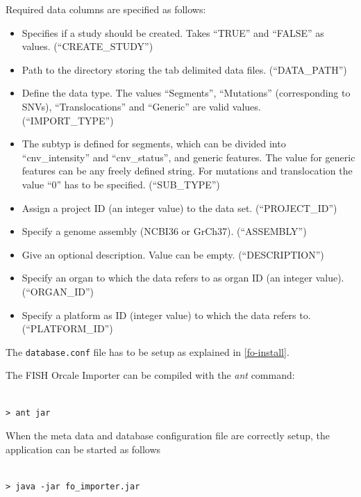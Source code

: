 \documentclass[11pt,final]{article}
\begin{document}
Required data columns are specified as follows:

\begin{itemize}
  \item Specifies if a study should be created. Takes ``TRUE'' and ``FALSE'' as
    values. (``{CREATE\_STUDY}'')
  \item Path to the directory storing the tab delimited data files.
        (``DATA\_PATH'')
  \item Define the data type. The values ``Segments'', ``Mutations''
        (corresponding to SNVs), ``Translocations'' and ``Generic'' are valid 
	values. (``IMPORT\_TYPE'')
  \item The subtyp is defined for segments, which can be divided into
        ``cnv\_intensity'' and ``cnv\_status'', and generic features. The value
	for generic features can be any freely defined string. For mutations and
	translocation the value ``0'' has to be specified. (``SUB\_TYPE'')
  \item Assign a project ID (an integer value) to the data set.
        (``PROJECT\_ID'')
  \item Specify a genome assembly (NCBI36 or GrCh37). (``ASSEMBLY'')
  \item Give an optional description. Value can be empty. (``DESCRIPTION'')
  \item Specify an organ to which the data refers to as organ ID (an integer
        value). (``ORGAN\_ID'')
  \item Specify a platform as ID (integer value) to which the data refers to.
        (``PLATFORM\_ID'')
\end{itemize}

The \texttt{database.conf} file has to be setup as explained in
\ref{fo-install}.

The FISH Orcale Importer can be compiled with the \textit{ant} command:

\begin{lstlisting}
  
> ant jar

\end{lstlisting}

When the meta data and database configuration file are correctly setup, the
application can be started as follows

\begin{lstlisting}
  
> java -jar fo_importer.jar

\end{lstlisting}
\end{document}
